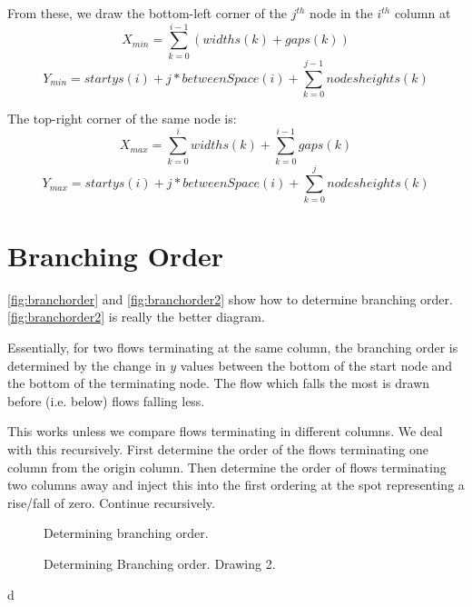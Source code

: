 \documentclass[11pt]{article}
\begin{document}
From these, we draw the bottom-left corner of the $j^{th}$ node in the $i^{th}$ column at
\begin{equation*}
X_{min} = \sum_{k=0}^{i-1}(widths(k) + gaps(k))
\end{equation*}
\begin{equation*}
Y_{min} =  startys(i) + j*betweenSpace(i) + \sum_{k=0}^{j-1} nodesheights(k)
\end{equation*}

The top-right corner of the same node is:
\begin{equation*}
X_{max} = \sum_{k=0}^{i}widths(k) +  \sum_{k=0}^{i-1}gaps(k)
\end{equation*}
\begin{equation*}
Y_{max} = startys(i) + j*betweenSpace(i) + \sum_{k=0}^{j} nodesheights(k)
\end{equation*}


\section{Branching Order}
\autoref{fig:branchorder} and \autoref{fig:branchorder2} show how to determine branching order.  \autoref{fig:branchorder2} is really the better diagram.

Essentially, for two flows terminating at the same column, the branching order is determined by the change in $y$ values between the bottom of the start node and the bottom of the terminating node.  The flow which falls the most is drawn before (i.e. below) flows falling less.

This works unless we compare flows terminating in different columns.  We deal with this recursively.  First determine the order of the flows terminating one column from the origin column.  Then determine the order of flows terminating two columns away and inject this into the first ordering at the spot representing a rise/fall of zero.  Continue recursively.


\begin{figure}
\caption{ Determining branching order. \label{fig:branchorder}}
\end{figure}

\begin{figure}
\caption{ Determining Branching order. Drawing 2. \label{fig:branchorder2}}
\end{figure}d
\end{document}
